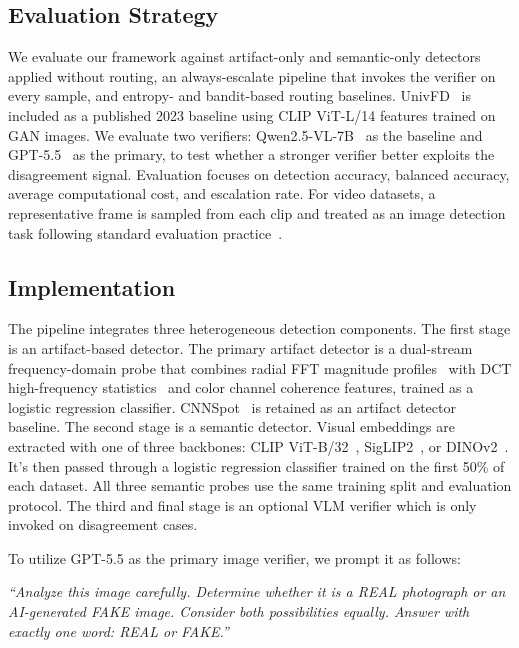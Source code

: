 \documentclass{ieeeaccess}
\begin{document}
\subsection{Evaluation Strategy}
We evaluate our framework against artifact-only and semantic-only detectors applied without routing, an always-escalate pipeline that invokes the verifier on every sample, and entropy- and bandit-based routing baselines. UnivFD~\cite{ojha2023fakedetect} is included
as a published 2023 baseline using CLIP ViT-L/14 features trained on GAN images. We
evaluate two verifiers: Qwen2.5-VL-7B~\cite{bai2025qwen25vltechnicalreport} as the
baseline and GPT-5.5~\cite{openai2026gpt55} as the primary, to test whether a stronger verifier better exploits the disagreement signal.
Evaluation focuses on detection accuracy, balanced accuracy, 
average computational cost, and escalation rate. For video 
datasets, a representative frame is sampled from each clip 
and treated as an image detection task following standard 
evaluation practice~\cite{wen2025busterxmllmpoweredaigeneratedvideo}.



\subsection{Implementation}

The pipeline integrates three heterogeneous detection components. The first stage is an artifact-based detector. The primary artifact detector is a dual-stream frequency-domain probe that combines radial FFT magnitude profiles~\cite{dzanic2020fourier} with DCT high-frequency statistics~\cite{frank2020leveraging, Corvi_2023_ICASSP} and color channel
coherence features, trained as a logistic regression classifier. CNNSpot~\cite{wang2020cnn} is retained as an artifact detector baseline. The second stage is a semantic detector. Visual embeddings are extracted with one of three backbones: CLIP
ViT-B/32~\cite{pmlr-v139-radford21a}, SigLIP2~\cite{tschannen2025siglip2}, or
DINOv2~\cite{oquab2023dinov2}. It's then passed through a logistic regression classifier trained on the first 50\% of each dataset. All three semantic probes use the same training split and evaluation protocol. The third and final stage is an optional VLM verifier which is only invoked 
on disagreement cases.


To utilize GPT-5.5 as the primary image verifier, we prompt it as follows:

\noindent
\begin{minipage}{\linewidth}
\vspace{10pt}
\itshape
``Analyze this image carefully. Determine whether it is a REAL photograph or an AI-generated FAKE image. Consider both possibilities equally. Answer with exactly one word: REAL or FAKE.''
\vspace{10pt}
\end{minipage}
\end{document}
